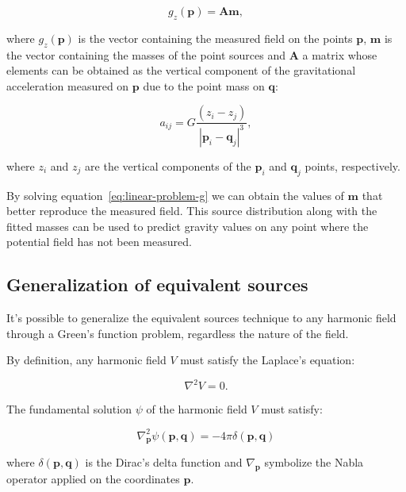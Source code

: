 \documentclass[twocolumn]{article}
\begin{document}
\begin{equation}
    g_z(\mathbf{p}) = \mathbf{A} \mathbf{m},
    \label{eq:linear-problem-g}
\end{equation}

\noindent where $g_z(\mathbf{p})$ is the vector containing the measured
field on the points $\mathbf{p}$, $\mathbf{m}$ is the vector containing the
masses of the point sources and $\mathbf{A}$ a matrix whose
elements can be obtained as the vertical component of the gravitational
acceleration measured on $\mathbf{p}$ due to the point mass on $\mathbf{q}$:

\begin{equation}
    a_{ij} = G \frac{(z_i - z_j)}{|\mathbf{p}_i - \mathbf{q}_j|^3},
\end{equation}

\noindent where $z_i$ and $z_j$ are the vertical components of the
$\mathbf{p}_i$ and $\mathbf{q}_j$ points, respectively.

By solving equation~\ref{eq:linear-problem-g} we can obtain the values of
$\mathbf{m}$ that better reproduce the measured field.
This source distribution along with the fitted masses can be used to predict
gravity values on any point where the potential field has not been measured.


\subsection{Generalization of equivalent sources}

It's possible to generalize the equivalent sources technique to any harmonic
field through a Green's function problem, regardless the nature of the field.

By definition, any harmonic field $V$ must satisfy the Laplace's equation:

\begin{equation}
    \nabla^2 V = 0.
\end{equation}

The fundamental solution $\psi$ \citep[p.~210]{vladimirov1979} of the harmonic
field $V$ must satisfy:

\begin{equation}
    \nabla_\mathbf{p}^2 \psi(\mathbf{p}, \mathbf{q}) =
        - 4\pi \delta(\mathbf{p}, \mathbf{q})
\end{equation}

\noindent where $\delta(\mathbf{p}, \mathbf{q})$ is the Dirac's delta function
and $\nabla_\mathbf{p}$ symbolize the Nabla operator applied on the
coordinates $\mathbf{p}$.
\end{document}
